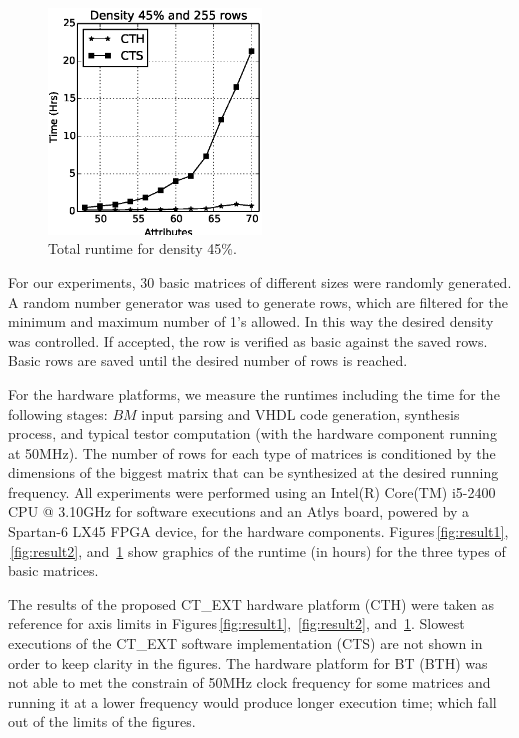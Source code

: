 \documentclass[authoryear,11pt]{elsarticle}
\begin{document}
	\begin{figure}[htb]
	    \begin{center}
	       \includegraphics[height=6cm]{med48_density.eps}
	    \end{center}
	\caption{Total runtime for density 45\%.}
	\label{fig:result3}
	\end{figure}	
	
	For our experiments, 30 basic matrices of different sizes were randomly generated. 
	A random number generator was used to generate rows, which are
	filtered for the minimum and maximum number of 1's allowed. In this way the desired density was
	controlled. If accepted, the row is verified as basic against the saved rows. Basic rows 
	are saved until the desired number of rows is reached. 
	
	For the hardware platforms, we measure the runtimes including the time for the following stages: $BM$ 
	input parsing and VHDL code generation, synthesis process, and typical testor computation (with the
	hardware component running at 50MHz). The number of rows for each type of matrices is conditioned by the
	dimensions of the biggest matrix that can be synthesized at the desired running frequency.
	All experiments were performed using an Intel(R) Core(TM) i5-2400 CPU @ 3.10GHz for software executions and 
	an Atlys board, powered by a Spartan-6 LX45 FPGA device, for the hardware components.
	Figures\,\ref{fig:result1}, \,\ref{fig:result2}, and \,\ref{fig:result3} show graphics of the runtime 
	(in hours) for the three types of basic matrices. 
	
	The results of the proposed CT\_EXT hardware platform (CTH) were taken as reference for axis limits in 
	Figures\,\ref{fig:result1}, \,\ref{fig:result2}, and \,\ref{fig:result3}.
	Slowest executions of the CT\_EXT software implementation (CTS) are not shown in order to keep clarity in 
	the figures. 
	The hardware platform for BT (BTH) was not able to met the constrain of 50MHz clock frequency for some 
	matrices and running it at a lower frequency would produce longer execution time; which fall out of the limits 
	of the figures.
	
\end{document}
